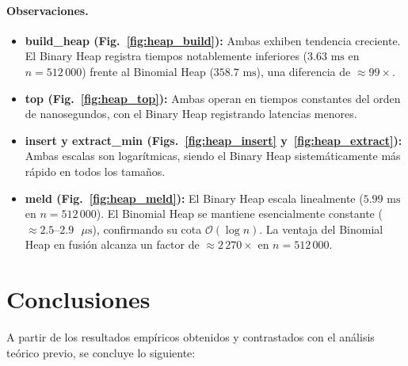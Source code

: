 \documentclass[11pt,letterpaper]{article}
\begin{document}
\paragraph{Observaciones.}
\begin{itemize}
    \item \textbf{build\_heap (Fig.~\ref{fig:heap_build}):} Ambas exhiben tendencia creciente. El Binary Heap registra tiempos notablemente inferiores ($3.63\text{ ms}$ en $n = 512\,000$) frente al Binomial Heap ($358.7\text{ ms}$), una diferencia de $\approx 99\times$.
    \item \textbf{top (Fig.~\ref{fig:heap_top}):} Ambas operan en tiempos constantes del orden de nanosegundos, con el Binary Heap registrando latencias menores.
    \item \textbf{insert y extract\_min (Figs.~\ref{fig:heap_insert} y~\ref{fig:heap_extract}):} Ambas escalas son logarítmicas, siendo el Binary Heap sistemáticamente más rápido en todos los tamaños.
    \item \textbf{meld (Fig.~\ref{fig:heap_meld}):} El Binary Heap escala linealmente ($5.99\text{ ms}$ en $n = 512\,000$). El Binomial Heap se mantiene esencialmente constante ($\approx 2.5\text{--}2.9\text{ }\mu\text{s}$), confirmando su cota $\mathcal{O}(\log n)$. La ventaja del Binomial Heap en fusión alcanza un factor de $\approx 2\,270\times$ en $n = 512\,000$.
\end{itemize}

\newpage
\section{Conclusiones}
A partir de los resultados empíricos obtenidos y contrastados con el análisis teórico previo, se concluye lo siguiente:
\end{document}
